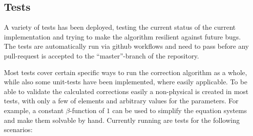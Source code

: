 \subsection{Tests}

A variety of tests has been deployed, testing the current status of the current implementation and 
trying to make the algorithm resilient against future bugs.
The tests are automatically run via github workflows and need to pass before any pull-request is 
accepted to the ``master''-branch of the repository.

Most tests cover certain specific ways to run the correction algorithm as a whole, 
while also some unit-tests have been implemented, where easily applicable.
To be able to validate the calculated corrections easily a non-physical 
is created in most tests, with only a few of elements and arbitrary values for the parameters. 
For example, a constant $\beta$-function of $1$ can be used to simplify the equation systems and make them solvable by hand.
Currently running are tests for the following scenarios:

